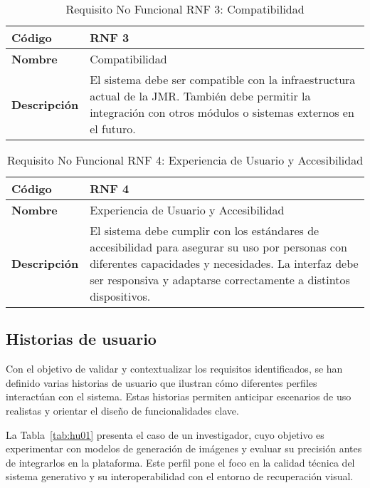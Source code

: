 \begin{table}[H] 
    \centering 
    \renewcommand{\arraystretch}{1.5} 
    \begin{tabular}{|l|p{12cm}|} 
        \hline \rowcolor{gray!30} 
        \textbf{Código} & \textbf{RNF 3} \\
        \hline 
        \textbf{Nombre} & Compatibilidad \\ 
        \hline
        \textbf{Descripción} & El sistema debe ser compatible con la infraestructura actual de la JMR. También debe permitir la integración con otros módulos o sistemas externos en el futuro. \\
        \hline 
    \end{tabular} 
    \caption{Requisito No Funcional RNF 3: Compatibilidad}
    \label{tab:reqnofun3} 
\end{table}

\begin{table}[H]
    \centering 
    \renewcommand{\arraystretch}{1.5}
    \begin{tabular}{|l|p{12cm}|} 
        \hline \rowcolor{gray!30}
        \textbf{Código} & \textbf{RNF 4} \\ 
        \hline
        \textbf{Nombre} & Experiencia de Usuario y Accesibilidad \\
        \hline \textbf{Descripción} & El sistema debe cumplir con los estándares de accesibilidad para asegurar su uso por personas con diferentes capacidades y necesidades. La interfaz debe ser responsiva y adaptarse correctamente a distintos dispositivos. \\ 
        \hline 
    \end{tabular} 
    \caption{Requisito No Funcional RNF 4: Experiencia de Usuario y Accesibilidad} 
    \label{tab:reqnofun4} 
\end{table}


\subsection{Historias de usuario}
Con el objetivo de validar y contextualizar los requisitos identificados, se han definido varias historias de usuario que ilustran cómo diferentes perfiles interactúan con el sistema. Estas historias permiten anticipar escenarios de uso realistas y orientar el diseño de funcionalidades clave.

La Tabla~\ref{tab:hu01} presenta el caso de un investigador, cuyo objetivo es experimentar con modelos de generación de imágenes y evaluar su precisión antes de integrarlos en la plataforma. Este perfil pone el foco en la calidad técnica del sistema generativo y su interoperabilidad con el entorno de recuperación visual.

